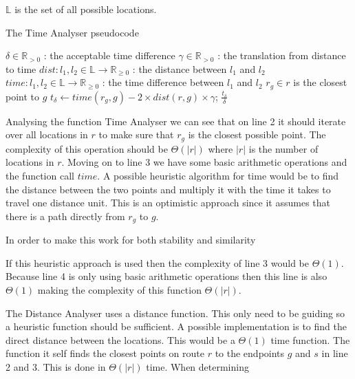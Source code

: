 \newpage

$\mathbb{L}$ is the set of all possible locations.

\begin{algorithm}
	\caption{The Time Analyser pseudocode}
	\begin{algorithmic}[1]
		\Require 
		\Statex $\delta\in \mathbb{R}_{>0}$ : the acceptable time difference
		\Statex $\gamma\in\mathbb{R}_{>0}$ : the translation from distance to time
		\Statex $dist : l_1,l_2 \in \mathbb{L} \rightarrow \mathbb{R}_{\geq 0}$ : the distance between $l_1$ and $l_2$
		\Statex $time : l_1,l_2 \in \mathbb{L} \rightarrow \mathbb{R}_{\geq 0}$ : the time difference between $l_1$ and $l_2$
		\Statex 
			\State $r_g \in r$ is the closest point to $g$
			\State $t_\delta\gets time(r_g, g) - 2\times dist(r,g)\times\gamma$;
			\State\Return $\frac{t_\delta}{\delta}$
		\EndFunction
	\end{algorithmic}
\end{algorithm}

Analysing the function Time Analyser we can see that on line 2 it should iterate over all locations in $r$ to make sure that $r_g$ is the closest possible point.
The complexity of this operation should be $\Theta(|r|)$ where $|r|$ is the number of locations in $r$.
Moving on to line 3 we have some basic arithmetic operations and the function call $time$.
A possible heuristic algorithm for time would be to find the distance between the two points and multiply it with the time it takes to travel one distance unit. 
This is an optimistic approach since it assumes that there is a path directly from $r_g$ to $g$.

In order to make this work for both stability and similarity

If this heuristic approach is used then the complexity of line 3 would be $\Theta(1)$.
Because line 4 is only using basic arithmetic operations then this line is also $\Theta(1)$ making the complexity of this function $\Theta(|r|)$.

The Distance Analyser uses a distance function.
This only need to be guiding so a heuristic function should be sufficient.
A possible implementation is to find the direct distance between the locations.
This would be a $\Theta(1)$ time function.
The function it self finds the closest points on route $r$ to the endpoints $g$ and $s$ in line 2 and 3.
This is done in $\Theta(|r|)$ time.
When determining 

